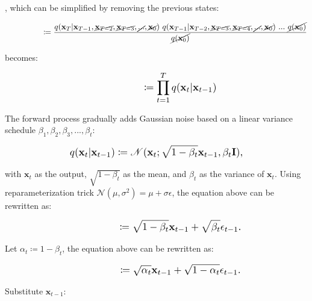 \documentclass{article}
\newcommand*{\Scale}[2][4]{\scalebox{#1}{\ensuremath{#2}}}
\begin{document}
, which can be simplified by removing the previous states:

\begin{equation}
\Scale[1.2]{ \displaystyle
\hspace{4.75em} \coloneq \frac{q(\textbf{x}_{T}|\textbf{x}_{T-1},\cancel{\textbf{x}_{T-2}},\cancel{\textbf{x}_{T-3}},\cancel{...},\cancel{\textbf{x}_{0}}) \ q(\textbf{x}_{T-1}|\textbf{x}_{T-2},\cancel{\textbf{x}_{T-3}},\cancel{\textbf{x}_{T-4}},\cancel{...},\cancel{\textbf{x}_{0}}) \ ... \ \cancel{ q(\textbf{x}_{0}) } } {  \cancel{ q(\textbf{x}_{0}) } } } 
\end{equation}

becomes:

\begin{equation}
\Scale[1.2]{ \displaystyle
\hspace{4.75em} \coloneq \displaystyle \prod_{t=1}^{T} q(\textbf{x}_{t}|\textbf{x}_{t-1}) }
\end{equation}

The forward process gradually adds Gaussian noise based on a linear variance schedule $ \beta_1, \beta_2, \beta_3, ..., \beta_t $:

\begin{equation}
\Scale[1.2]{ \displaystyle
q(\textbf{x}_{t}|\textbf{x}_{t-1}) \coloneq \mathscr{N}(\textbf{x}_{t};\sqrt{1-\beta_t}\textbf{x}_{t-1},\beta_t \textbf{I}), }
\end{equation}

with $ \textbf{x}_{t} $ as the output, $ \sqrt{1-\beta_t} $ as the mean, and $ \beta_t $ as the variance of $ \textbf{x}_{t} $. Using reparameterization trick $ \mathscr{N}(\mu,\sigma^2) = \mu + \sigma \epsilon $, the equation above can be rewritten as:

\begin{equation}
\Scale[1.2]{ \displaystyle
\hspace{4.75em} \coloneq \sqrt{1-\beta_t}\textbf{x}_{t-1} + \sqrt{\beta_t}\epsilon_{t-1}. }
\end{equation}

Let $ \alpha_t \coloneq 1 - \beta_t $, the equation above can be rewritten as:

\begin{equation}
\Scale[1.2]{ \displaystyle
\hspace{4.75em} \coloneq \sqrt{\alpha_t}\textbf{x}_{t-1} + \sqrt{1-\alpha_t}\epsilon_{t-1}. }
\end{equation}

Substitute $ \textbf{x}_{t-1} $:
\end{document}
